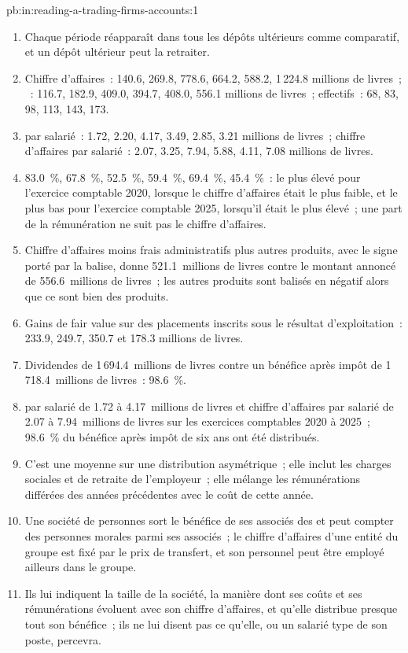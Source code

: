 \begin{solution}{pb:in:reading-a-trading-firms-accounts:1}
\begin{enumerate}
\item Chaque période réapparaît dans tous les dépôts ultérieurs comme comparatif, et un dépôt ultérieur peut la retraiter.
\item Chiffre d'affaires~: 140.6, 269.8, 778.6, 664.2, 588.2, 1\,224.8 millions de livres~; ~: 116.7, 182.9, 409.0, 394.7,
408.0, 556.1 millions de livres~; effectifs~: 68, 83, 98, 113, 143, 173.
\item {} par salarié~: 1.72, 2.20, 4.17, 3.49, 2.85, 3.21 millions de livres~; chiffre d'affaires par salarié~: 2.07, 3.25, 7.94,
5.88, 4.11, 7.08 millions de livres.
\item 83.0~\%, 67.8~\%, 52.5~\%, 59.4~\%, 69.4~\%, 45.4~\%~: le plus élevé pour l'exercice comptable 2020, lorsque le chiffre d'affaires était le plus faible, et le plus bas pour
l'exercice comptable 2025, lorsqu'il était le plus élevé~; une part de la rémunération ne suit pas le chiffre d'affaires.
\item Chiffre d'affaires moins frais administratifs plus autres produits, avec le signe porté par la balise, donne 521.1~millions de livres contre le
montant annoncé de 556.6~millions de livres~; les autres produits sont balisés en négatif alors que ce sont bien des produits.
\item Gains de fair value sur des placements inscrits sous le résultat d'exploitation~: 233.9, 249.7, 350.7 et 178.3 millions de livres.
\item Dividendes de 1\,694.4~millions de livres contre un bénéfice après impôt de 1\,718.4~millions de livres~: 98.6~\%.
\item {} par salarié de 1.72 à 4.17~millions de livres et chiffre d'affaires par salarié de 2.07 à 7.94~millions de livres sur les exercices comptables 2020 à 2025~;
98.6~\% du bénéfice après impôt de six ans ont été distribués.
\item C'est une moyenne sur une distribution asymétrique~; elle inclut les charges sociales et de retraite de l'employeur~; elle mélange
les rémunérations différées des années précédentes avec le coût de cette année.
\item Une société de personnes sort le bénéfice de ses associés des  et peut compter des personnes morales parmi ses associés~; le chiffre d'affaires d'une entité du groupe
est fixé par le prix de transfert, et son personnel peut être employé ailleurs dans le groupe.
\item Ils lui indiquent la taille de la société, la manière dont ses coûts et ses rémunérations évoluent avec son chiffre d'affaires, et qu'elle distribue presque tout son
bénéfice~; ils ne lui disent pas ce qu'elle, ou un salarié type de son poste, percevra.
\end{enumerate}
\end{solution}

